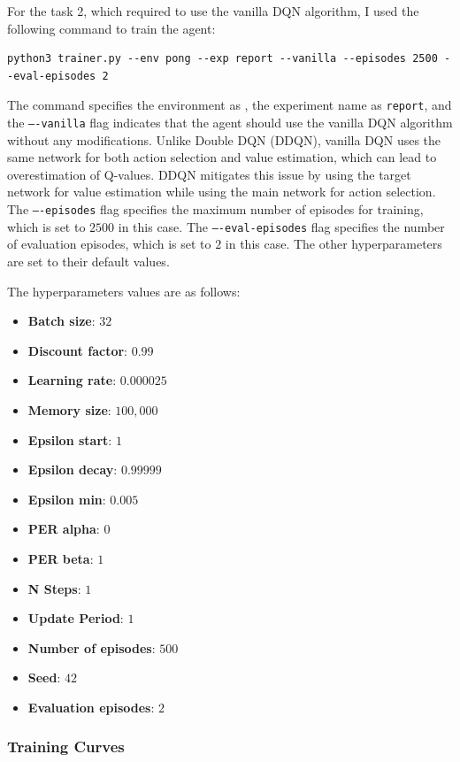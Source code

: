 For the task 2, which required to use the vanilla DQN algorithm, I used the following command to train the agent:

\begin{verbatim}
python3 trainer.py --env pong --exp report --vanilla --episodes 2500 --eval-episodes 2
\end{verbatim}

The command specifies the environment as \pong, the experiment name as \texttt{report}, and the \texttt{----vanilla} flag indicates that the agent should use the vanilla DQN algorithm without any modifications.
Unlike Double DQN (DDQN), vanilla DQN uses the same network for both action selection and value estimation, which can lead to overestimation of Q-values.
DDQN mitigates this issue by using the target network for value estimation while using the main network for action selection.
The \texttt{----episodes} flag specifies the maximum number of episodes for training, which is set to $2500$ in this case.
The \texttt{----eval-episodes} flag specifies the number of evaluation episodes, which is set to $2$ in this case.
The other hyperparameters are set to their default values.

The hyperparameters values are as follows:
\begin{itemize}
    \item \textbf{Batch size}: $32$
    \item \textbf{Discount factor}: $0.99$
    \item \textbf{Learning rate}: $0.000025$
    \item \textbf{Memory size}: $100,000$
    \item \textbf{Epsilon start}: $1$
    \item \textbf{Epsilon decay}: $0.99999$
    \item \textbf{Epsilon min}: $0.005$
    \item \textbf{PER alpha}: $0$
    \item \textbf{PER beta}: $1$
    \item \textbf{N Steps}: $1$
    \item \textbf{Update Period}: $1$
    \item \textbf{Number of episodes}: $500$
    \item \textbf{Seed}: $42$
    \item \textbf{Evaluation episodes}: $2$
\end{itemize}

\subsubsection{Training Curves}


